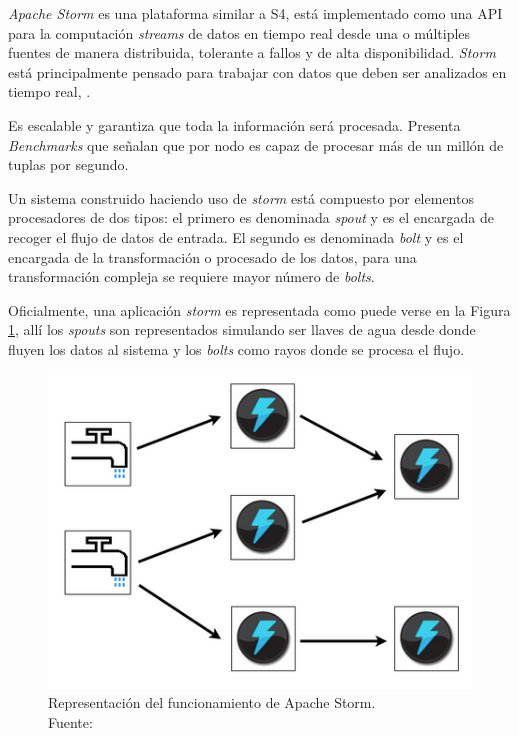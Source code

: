 \textit{Apache Storm} es una plataforma similar a S4, está implementado como una API para la computación \textit{streams} de datos en tiempo real desde una o múltiples fuentes de manera distribuida, tolerante a fallos y de alta disponibilidad. \textit{Storm} está principalmente pensado para trabajar con datos que deben ser analizados en tiempo real, \cite{Storm}.

Es escalable y garantiza que toda la información será procesada. Presenta \textit{Benchmarks} que señalan que por nodo es capaz de procesar más de un millón de tuplas por segundo.

Un sistema construido haciendo uso de \textit{storm} está compuesto por elementos procesadores de dos tipos: el primero es denominada \textit{spout} y es el encargada de recoger el flujo de datos de entrada. El segundo es denominada \textit{bolt} y es el encargada de la transformación o procesado de los datos, para una transformación compleja se requiere mayor número de \textit{bolts}.

Oficialmente, una aplicación \textit{storm} es representada como puede verse en la Figura \ref{fig:stormBeLike}, allí los \textit{spouts} son representados simulando ser llaves de agua desde donde fluyen los datos al sistema y los \textit{bolts} como rayos donde se procesa el flujo.

\begin{figure}[H]
	\centering
	\captionsetup{justification=centering}
	\includegraphics[scale=0.6]{images/stormBeLike.png}
	\caption[Representación del funcionamiento de Apache Storm.]{Representación del funcionamiento de Apache Storm.\\Fuente: \cite{StormFigure}}
	\label{fig:stormBeLike}
\end{figure}

